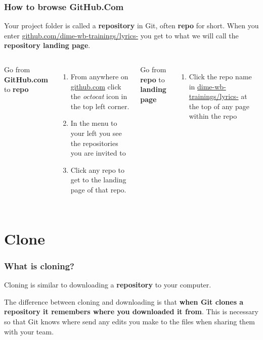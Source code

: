 \documentclass[aspectratio=169]{beamer} %
\newcommand{\trainingURL}[1]{{\color{blue}\url{#1}}}
\newcommand{\traininerUsername}{dime-wb-trainings}
\newcommand{\repoName}{\traininerUsername/lyrics-}
\newcommand{\trainingRepoURL}[1]{\trainingURL{github.com/\repoName #1}}
\begin{document}
\begin{frame}
\frametitle{How to browse GitHub.Com}

	Your project folder is called a \textbf{repository} in Git, often \textbf{repo} for short.
	When you enter \trainingRepoURL{} you get to what we will call the \textbf{repository landing page}.

	\vspace{.5cm}

	\begin{columns}[T]

		Go from \textbf{GitHub.com} to \textbf{repo}
		\begin{enumerate}
			\item From anywhere on \trainingURL{github.com} click the \textit{octocat} icon in the top left corner.
			\item In the menu to your left you see the repositories you are invited to
			\item Click any repo to get to the landing page of that repo.
		\end{enumerate}

		Go from \textbf{repo} to \textbf{landing page}
		\begin{enumerate}
			\item Click the repo name in {\color{blue}\url{\repoName}} at the top of any page within the repo
		\end{enumerate}

	\end{columns}
\end{frame}

\section{Clone}

\begin{frame}
\frametitle{What is cloning?}

	Cloning is similar to downloading a \textbf{repository} to your computer.

	\vspace{.5cm}

	The difference between cloning and downloading is that \textbf{when Git clones a repository it remembers where you downloaded it from}. This is necessary so that Git knows where send any edits you make to the files when sharing them with your team.

\end{frame}
\end{document}
